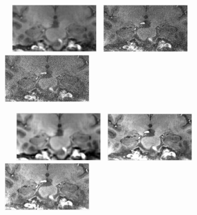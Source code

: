 \documentclass[]{article}
\title{}
\author{}
\begin{document}
\begin{figure}
~
{\includegraphics[width=0.33\textwidth]{noisy5023_200_x.pdf}}~
{\includegraphics[width=0.33\textwidth]{noisy5023_400_x.pdf}}~
{\includegraphics[width=0.33\textwidth]{noisy5023_700_x.pdf}}~\\
\vspace{-1em}

~
~{\includegraphics[width=0.33\textwidth]{denoised5023_200_x.pdf}}~
{\includegraphics[width=0.33\textwidth]{denoised5023_400_x.pdf}}~
{\includegraphics[width=0.33\textwidth]{denoised5023_700_x.pdf}}~\\
\vspace{-1em}



\end{figure}
\end{document}

